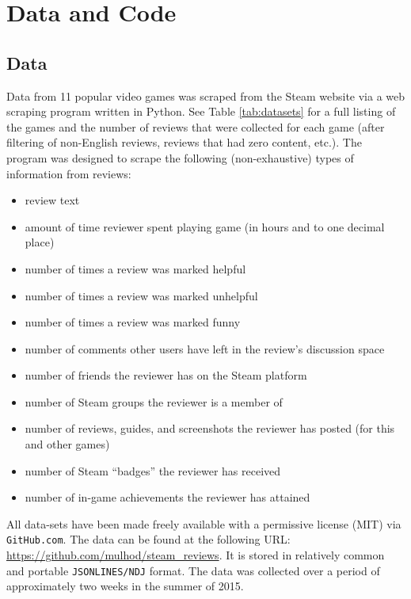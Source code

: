 \documentclass[9pt]{article}
\begin{document}
\section{Data and Code}
\label{sec:data_and_code}

\subsection{Data}
\label{ssec:data}

Data from 11 popular video games was scraped from the Steam website via a web scraping program written in Python. See Table \ref{tab:datasets} for a full listing of the games and the number of reviews that were collected for each game (after filtering of non-English reviews, reviews that had zero content, etc.). The program was designed to scrape the following (non-exhaustive) types of information from reviews:

\begin{itemize}
\item review text
\item amount of time reviewer spent playing game (in hours and to one decimal place)
\item number of times a review was marked helpful
\item number of times a review was marked unhelpful
\item number of times a review was marked funny
\item number of comments other users have left in the review's discussion space
\item number of friends the reviewer has on the Steam platform
\item number of Steam groups the reviewer is a member of
\item number of reviews, guides, and screenshots the reviewer has posted (for this and other games)
\item number of Steam ``badges'' the reviewer has received
\item number of in-game achievements the reviewer has attained
\end{itemize}

All data-sets have been made freely available with a permissive license (MIT) via {\tt GitHub.com}. The data can be found at the following URL: \url{https://github.com/mulhod/steam_reviews}. It is stored in relatively common and portable {\tt JSONLINES/NDJ} format. The data was collected over a period of approximately two weeks in the summer of 2015.
\end{document}
